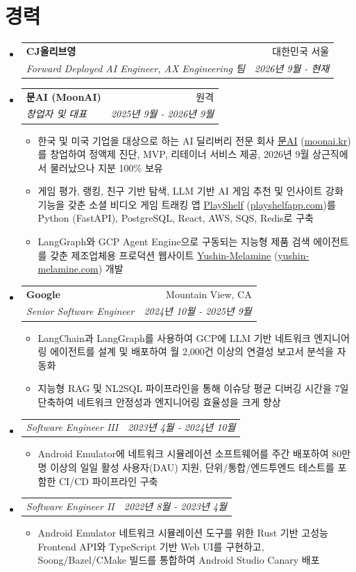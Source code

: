\documentclass[10pt]{article}
\makeatletter
\newcommand{\resumeItem}[1]{\item\small{#1}}
\newcommand{\resumeSubheading}[4]{
  \vspace{-2pt}\item[]
    \begin{tabular*}{\linewidth}[t]{l@{\extracolsep{\fill}}r}
      \textbf{#1} & #2 \\
      \textit{\small#3} & \textit{\small #4} \\
    \end{tabular*}\vspace{-5pt}
}
\newcommand{\resumePosition}[2]{
  \vspace{-2pt}\item[]
    \begin{tabular*}{\linewidth}[t]{l@{\extracolsep{\fill}}r}
      \textit{\small#1} & \textit{\small #2} \\
    \end{tabular*}\vspace{-5pt}
}
\makeatother
\begin{document}
\section{경력}
\begin{itemize}[leftmargin=0.15in, label={}, itemsep=0pt]
    \resumeSubheading
        {CJ올리브영}{대한민국 서울}
        {Forward Deployed AI Engineer, AX Engineering 팀}{2026년 9월 - 현재}
        \vspace{8pt}

    \resumeSubheading
        {문AI (MoonAI)}{원격}
        {창업자 및 대표}{2025년 9월 - 2026년 9월}
        \begin{itemize}[leftmargin=0.2in, itemsep=0pt]
            \resumeItem{한국 및 미국 기업을 대상으로 하는 AI 딜리버리 전문 회사 \href{https://moonai.kr}{문AI} (\href{https://moonai.kr}{moonai.kr})를 창업하여 정액제 진단, MVP, 리테이너 서비스 제공, 2026년 9월 상근직에서 물러났으나 지분 100\% 보유}
            \resumeItem{게임 평가, 랭킹, 친구 기반 탐색, LLM 기반 AI 게임 추천 및 인사이트 강화 기능을 갖춘 소셜 비디오 게임 트래킹 앱 \href{https://playshelfapp.com}{PlayShelf} (\href{https://playshelfapp.com}{playshelfapp.com})를 Python (FastAPI), PostgreSQL, React, AWS, SQS, Redis로 구축}
            \resumeItem{LangGraph와 GCP Agent Engine으로 구동되는 지능형 제품 검색 에이전트를 갖춘 제조업체용 프로덕션 웹사이트 \href{https://yushin-melamine.com}{Yushin-Melamine} (\href{https://yushin-melamine.com}{yushin-melamine.com}) 개발}
        \end{itemize}

    \resumeSubheading
        {Google}{Mountain View, CA}
        {Senior Software Engineer}{2024년 10월 - 2025년 9월}
        \begin{itemize}[leftmargin=0.2in, itemsep=0pt]
            \resumeItem{LangChain과 LangGraph를 사용하여 GCP에 LLM 기반 네트워크 엔지니어링 에이전트를 설계 및 배포하여 월 2,000건 이상의 연결성 보고서 분석을 자동화}
            \resumeItem{지능형 RAG 및 NL2SQL 파이프라인을 통해 이슈당 평균 디버깅 시간을 7일 단축하여 네트워크 안정성과 엔지니어링 효율성을 크게 향상}
        \end{itemize}
        \resumePosition{Software Engineer III}{2023년 4월 - 2024년 10월}
        \begin{itemize}[leftmargin=0.2in, itemsep=0pt]
            \resumeItem{Android Emulator에 네트워크 시뮬레이션 소프트웨어를 주간 배포하여 80만 명 이상의 일일 활성 사용자(DAU) 지원, 단위/통합/엔드투엔드 테스트를 포함한 CI/CD 파이프라인 구축}
        \end{itemize}
        \resumePosition{Software Engineer II}{2022년 8월 - 2023년 4월}
        \begin{itemize}[leftmargin=0.2in, itemsep=0pt]
            \resumeItem{Android Emulator 네트워크 시뮬레이션 도구를 위한 Rust 기반 고성능 Frontend API와 TypeScript 기반 Web UI를 구현하고, Soong/Bazel/CMake 빌드를 통합하여 Android Studio Canary 배포}
        \end{itemize}


\end{itemize}
\end{document}
